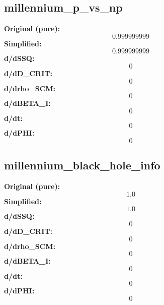 \subsection{millennium_p_vs_np}
\textbf{Original (pure):}
\begin{equation}
0.999999999
\end{equation}
\textbf{Simplified:}
\begin{equation}
0.999999999
\end{equation}
\textbf{d/dSSQ:}
\begin{equation}
0
\end{equation}
\textbf{d/dD_CRIT:}
\begin{equation}
0
\end{equation}
\textbf{d/drho_SCM:}
\begin{equation}
0
\end{equation}
\textbf{d/dBETA_I:}
\begin{equation}
0
\end{equation}
\textbf{d/dt:}
\begin{equation}
0
\end{equation}
\textbf{d/dPHI:}
\begin{equation}
0
\end{equation}

\subsection{millennium_black_hole_info}
\textbf{Original (pure):}
\begin{equation}
1.0
\end{equation}
\textbf{Simplified:}
\begin{equation}
1.0
\end{equation}
\textbf{d/dSSQ:}
\begin{equation}
0
\end{equation}
\textbf{d/dD_CRIT:}
\begin{equation}
0
\end{equation}
\textbf{d/drho_SCM:}
\begin{equation}
0
\end{equation}
\textbf{d/dBETA_I:}
\begin{equation}
0
\end{equation}
\textbf{d/dt:}
\begin{equation}
0
\end{equation}
\textbf{d/dPHI:}
\begin{equation}
0
\end{equation}

